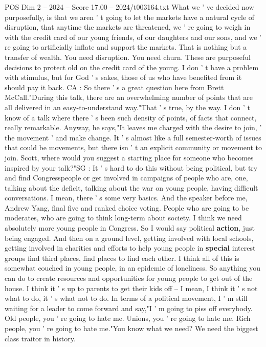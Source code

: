 \begin{textsample}{POS Dim 2 – 2024 – Score 17.00 – 2024/t003164.txt}
What we ' ve decided now purposefully, is that we aren ' t going to let the markets have a natural cycle of disruption, that anytime the markets are threatened, we ' re going to weigh in with the credit card of our young friends, of our daughters and our sons, and we ' re going to artificially inflate and support the markets.
That is nothing but a transfer of wealth.
You need disruption.
You need churn.
These are purposeful decisions to protect old on the credit card of the young.
I don ' t have a problem with stimulus, but for God ' s sakes, those of us who have benefited from it should pay it back.
CA : So there ' s a great question here from Brett McCall."During this talk, there are an overwhelming number of points that are all delivered in an easy-to-understand way."That ' s true, by the way.
I don ' t know of a talk where there ' s been such density of points, of facts that connect, really remarkable.
Anyway, he says,"It leaves me charged with the desire to join, ' the movement ' and make change.
It ' s almost like a full semester-worth of issues that could be movements, but there isn ' t an explicit community or movement to join.
Scott, where would you suggest a starting place for someone who becomes inspired by your talk?"SG : It ' s hard to do this without being political, but try and find Congresspeople or get involved in campaigns of people who are, one, talking about the deficit, talking about the war on young people, having difficult conversations.
I mean, there ' s some very basics.
And the speaker before me, Andrew Yang, final five and ranked choice voting.
People who are going to be moderates, who are going to think long-term about society.
I think we need absolutely more young people in Congress.
So I would say political \textbf{action}, just being engaged.
And then on a ground level, getting involved with local schools, getting involved in charities and efforts to help young people in \textbf{special} interest groups find third places, find places to find each other.
I think all of this is somewhat couched in young people, in an epidemic of loneliness.
So anything you can do to create resources and opportunities for young people to get out of the house.
I think it ' s up to parents to get their kids off -- I mean, I think it ' s not what to do, it ' s what not to do.
In terms of a political movement, I ' m still waiting for a leader to come forward and say,"I ' m going to piss off everybody.
Old people, you ' re going to hate me.
Unions, you ' re going to hate me.
Rich people, you ' re going to hate me."You know what we need?
We need the biggest class traitor in history.

\end{textsample}
